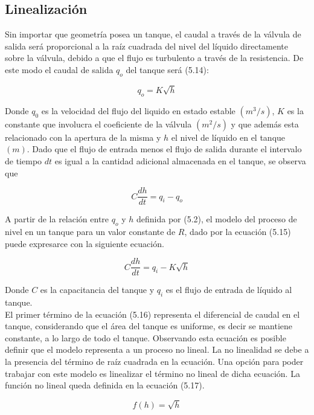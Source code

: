 \documentclass[a4paper,12pt,twoside]{proyectotanquesecci}
\begin{document}
\subsection{Linealización}

Sin importar que geometría posea un tanque, el caudal a través de la válvula de salida será proporcional a la raíz cuadrada del nivel del líquido directamente sobre la válvula, debido a que el flujo es turbulento a través de la resistencia. De este modo el caudal de salida $q_{o}$ del tanque será (5.14):

\begin{equation}
q_{o}=K\sqrt{h}
\end{equation}

Donde $q_{0}$ es la velocidad del flujo del liquido en estado estable $(m^{3}/s)$, $K$ es la constante que involucra el coeficiente de la válvula $(m^{2}/s)$ y que además esta relacionado con la apertura de la misma y $h$ el nivel de líquido en el tanque $(m)$. Dado que el flujo de entrada menos el flujo de salida durante el intervalo de tiempo $dt$ es igual a la cantidad adicional almacenada en el tanque, se observa que

\begin{equation}
C\frac{dh}{dt}=q_{i}-q_{o}
\end{equation}

A partir de la relación entre $q_{o}$ y $h$ definida por (5.2), el modelo del proceso de nivel en un tanque para un valor constante de $R$, dado por la ecuación (5.15) puede expresarce con la siguiente ecuación.

\begin{equation}
C\frac{dh}{dt}=q_{i}-K\sqrt{h}
\end{equation}

Donde $C$ es la capacitancia del tanque y $q_{i}$ es el flujo de entrada de líquido al tanque. \\

El primer término de la ecuación (5.16) representa el diferencial de caudal en el tanque, considerando que el área del tanque es uniforme, es decir se mantiene constante, a lo largo de todo el tanque. Observando esta ecuación es posible definir que el modelo representa a un proceso no lineal. La no linealidad se debe a la presencia del término de raíz cuadrada en la ecuación. Una opción para poder trabajar con este modelo es linealizar el término no lineal de dicha ecuación. La función no lineal queda definida en la ecuación (5.17).

\begin{equation}
f(h)=\sqrt{h}
\end{equation}
\end{document}
